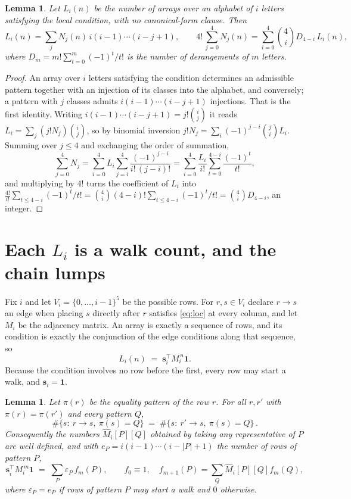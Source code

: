 \documentclass[11pt,a4paper]{article}
\theoremstyle{plain}
\newtheorem{lemma}[theorem]{Lemma}
\theoremstyle{definition}
\begin{document}
\begin{lemma}\label{lem:inv}
Let $L_i(n)$ be the number of arrays over an alphabet of $i$ letters satisfying the local
condition, with no canonical-form clause. Then
\[
L_i(n)=\sum_j N_j(n)\,i(i-1)\cdots(i-j+1),
\qquad
4!\,\sum_{j=0}^{4}N_j(n)=\sum_{i=0}^{4}\binom{4}{i}D_{4-i}\,L_i(n),
\]
where $D_m=m!\sum_{t=0}^{m}(-1)^t/t!$ is the number of derangements of $m$ letters.
\end{lemma}

\begin{proof}
An array over $i$ letters satisfying the condition determines an admissible pattern together
with an injection of its classes into the alphabet, and conversely; a pattern with $j$
classes admits $i(i-1)\cdots(i-j+1)$ injections. That is the first identity. Writing
$i(i-1)\cdots(i-j+1)=j!\binom{i}{j}$ it reads $L_i=\sum_j (j!N_j)\binom{i}{j}$, so by
binomial inversion $j!N_j=\sum_{i}(-1)^{j-i}\binom{j}{i}L_i$. Summing over
$j\le 4$ and exchanging the order of summation,
\[
\sum_{j=0}^{4}N_j=\sum_{i=0}^{4}L_i\sum_{j=i}^{4}\frac{(-1)^{j-i}}{i!\,(j-i)!}
=\sum_{i=0}^{4}\frac{L_i}{i!}\sum_{t=0}^{4-i}\frac{(-1)^t}{t!} ,
\]
and multiplying by $4!$ turns the coefficient of $L_i$ into
$\frac{4!}{i!}\sum_{t\le 4-i}(-1)^t/t!=\binom{4}{i}(4-i)!\sum_{t\le 4-i}(-1)^t/t!
=\binom{4}{i}D_{4-i}$, an integer.
\end{proof}

\section{Each $L_i$ is a walk count, and the chain lumps}

Fix $i$ and let $V_i=\{0,\dots,i-1\}^{5}$ be the possible rows. For $r,s\in V_i$
declare $r\to s$ an edge when placing $s$ directly after $r$ satisfies \eqref{eq:loc} at
every column, and let $M_i$ be the adjacency matrix. An array is exactly a sequence of
rows, and its condition is exactly the conjunction of the edge conditions along that
sequence, so
\[
L_i(n)\;=\;\mathbf{s}_i^{\!\top}M_i^{\,n}\mathbf{1} .
\]
Because the condition involves no row before the first, every
row may start a walk, and $\mathbf{s}_i=\mathbf{1}$.

\begin{lemma}\label{lem:lump}
Let $\pi(r)$ be the equality pattern of the row $r$. For all $r,r'$ with
$\pi(r)=\pi(r')$ and every pattern $Q$,
\[
\#\{s:\ r\to s,\ \pi(s)=Q\}\;=\;\#\{s:\ r'\to s,\ \pi(s)=Q\}\, .
\]
Consequently the numbers $\widehat M_i[P][Q]$ obtained by taking any representative of $P$
are well defined, and with $e_P=i(i-1)\cdots(i-|P|+1)$ the number of rows of pattern $P$,
\[
\mathbf{s}_i^{\!\top}M_i^{\,m}\mathbf{1}\;=\;\sum_P \varepsilon_P\,f_m(P),
\qquad f_0\equiv1,\quad f_{m+1}(P)=\sum_Q\widehat M_i[P][Q]f_m(Q),
\]
where $\varepsilon_P=e_P$ if rows of pattern $P$ may start a walk and $0$ otherwise.
\end{lemma}
\end{document}
